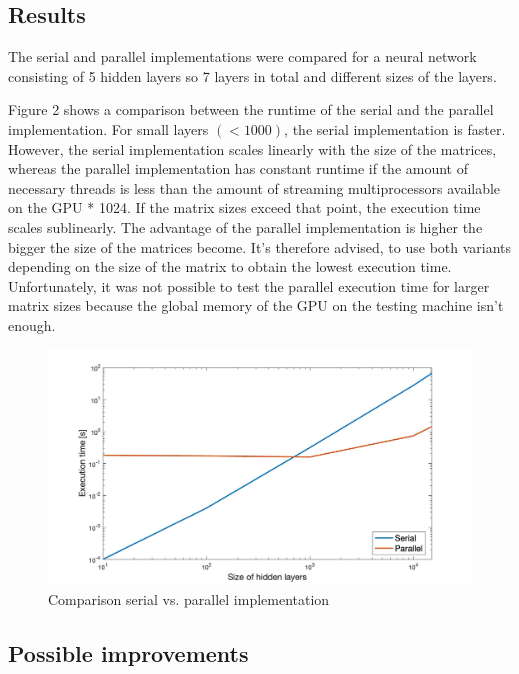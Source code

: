 \documentclass[sigconf]{acmart}
\begin{document}
\subsection{Results}


The serial and parallel implementations were compared for a neural network consisting of 5 hidden layers so 7 layers in total and different sizes of the layers.

Figure 2 shows a comparison between the runtime of the serial and the parallel implementation. For small layers $(<1000)$, the serial implementation 
is faster. However, the serial implementation scales linearly with the size of the matrices, whereas the parallel implementation has constant runtime if the
amount of necessary threads is less than the amount of streaming multiprocessors available on the GPU * 1024. If the matrix sizes exceed that point, the execution time
scales sublinearly. The advantage of the parallel implementation is higher the bigger the size of the matrices become.
It's therefore advised, to use both variants depending on the size of the matrix to obtain the lowest execution time.
Unfortunately, it was not possible to test the parallel execution time for larger matrix sizes because the global memory of the GPU on the testing machine isn't enough.

\begin{figure}[H]
    \includegraphics[width=\columnwidth]{imgs/results.jpg}
    \caption{Comparison serial vs. parallel implementation}
\end{figure}

\subsection{Possible improvements}
\end{document}
